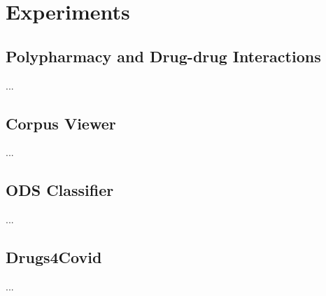 

\chapter{Experiments}\label{ch:experiments}

\graphicspath{{experiments/figures/}}


\section{Polypharmacy and Drug-drug Interactions}
...

\section{Corpus Viewer}
...

\section{ODS Classifier}
...

\section{Drugs4Covid}
...